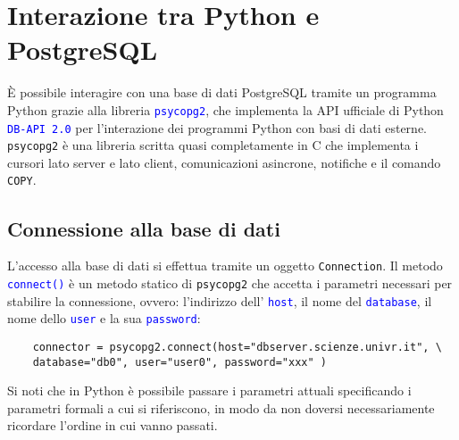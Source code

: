 \documentclass[12pt,a4paper]{book}
\begin{document}
	\chapter{Interazione tra Python e PostgreSQL}
	È possibile interagire con una base di dati PostgreSQL tramite un programma Python grazie alla libreria \textcolor{blue}{\texttt{psycopg2}}, che implementa la API ufficiale di Python \textcolor{blue}{\texttt{DB-API 2.0}} per l'interazione dei programmi Python con basi di dati esterne.
	\\\texttt{psycopg2} è una libreria scritta quasi completamente in C che implementa i cursori lato server e lato client, comunicazioni asincrone, notifiche e il comando \texttt{COPY}.
	\section{Connessione alla base di dati}
	L'accesso alla base di dati si effettua tramite un oggetto \texttt{Connection}. Il metodo \textcolor{blue}{\texttt{connect()}} è un metodo statico di \texttt{psycopg2} che accetta i parametri necessari per stabilire la connessione, ovvero: l'indirizzo dell' \textcolor{blue}{\texttt{host}}, il nome del \textcolor{blue}{\texttt{database}}, il nome dello \textcolor{blue}{\texttt{user}} e la sua \textcolor{blue}{\texttt{password}}:
	\begin{lstlisting}
	connector = psycopg2.connect(host="dbserver.scienze.univr.it", \
	database="db0", user="user0", password="xxx" )
	\end{lstlisting}
	Si noti che in Python è possibile passare i parametri attuali specificando i parametri formali a cui si riferiscono, in modo da non doversi necessariamente ricordare l'ordine in cui vanno passati.\\
\end{document}
